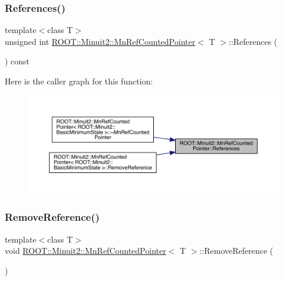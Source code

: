 \mbox{\label{classROOT_1_1Minuit2_1_1MnRefCountedPointer_acffac58848d817d7747631954daf3e0c}} 
\subsubsection{\texorpdfstring{References()}{References()}\hspace{0.1cm}{\footnotesize\ttfamily [2/2]}}
{\footnotesize\ttfamily template$<$class T$>$ \\
unsigned int \mbox{\hyperlink{classROOT_1_1Minuit2_1_1MnRefCountedPointer}{R\+O\+O\+T\+::\+Minuit2\+::\+Mn\+Ref\+Counted\+Pointer}}$<$ T $>$\+::References (\begin{DoxyParamCaption}{ }\end{DoxyParamCaption}) const\hspace{0.3cm}{\ttfamily [inline]}}

Here is the caller graph for this function\+:\nopagebreak
\begin{figure}[H]
\begin{center}
\leavevmode
\includegraphics[width=350pt]{d5/d13/classROOT_1_1Minuit2_1_1MnRefCountedPointer_acffac58848d817d7747631954daf3e0c_icgraph}
\end{center}
\end{figure}
\mbox{\label{classROOT_1_1Minuit2_1_1MnRefCountedPointer_a8e348ffb51b9ed7793cce28e6330309f}} 
\subsubsection{\texorpdfstring{RemoveReference()}{RemoveReference()}\hspace{0.1cm}{\footnotesize\ttfamily [1/2]}}
{\footnotesize\ttfamily template$<$class T$>$ \\
void \mbox{\hyperlink{classROOT_1_1Minuit2_1_1MnRefCountedPointer}{R\+O\+O\+T\+::\+Minuit2\+::\+Mn\+Ref\+Counted\+Pointer}}$<$ T $>$\+::Remove\+Reference (\begin{DoxyParamCaption}{ }\end{DoxyParamCaption})\hspace{0.3cm}{\ttfamily [inline]}}


